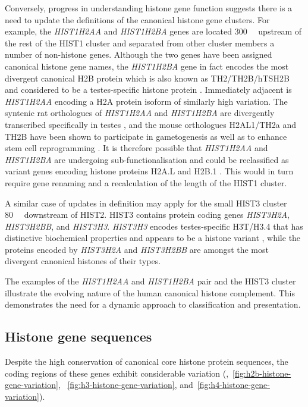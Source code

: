     Conversely, progress in understanding histone gene function
    suggests there is a need to update the definitions of the canonical histone gene clusters.
    For example, the \textit{HIST1H2AA} and \textit{HIST1H2BA} genes
    are located \SI{300}{\kilo\bp} upstream of the rest of the HIST1 cluster
    and separated from other cluster members a number of non-histone genes.
    Although the two genes have been assigned canonical histone gene names,
    the \textit{HIST1H2BA} gene in fact encodes the most divergent canonical H2B protein
    which is also known as TH2/TH2B/hTSH2B and considered to be
    a testes-specific histone protein \citep{Zalensky2002,LiAusio2005,Shinagawa2014}.
    Immediately adjacent is \textit{HIST1H2AA} encoding
    a H2A protein isoform of similarly high variation.
    The syntenic rat orthologues of \textit{HIST1H2AA} and \textit{HIST1H2BA}
    are divergently transcribed specifically in testes \citep{HuhChae1991},
    and the mouse orthologues H2AL1/TH2a and TH2B have been shown
    to participate in gametogenesis \citep{GovinCaron2007}
    as well as to enhance stem cell reprogramming \citep{ShinagawaIshii2014,PadavattanKumarevel2015}.
    It is therefore possible that \textit{HIST1H2AA} and \textit{HIST1H2BA}
    are undergoing sub-functionalisation and could be reclassified
    as variant genes encoding histone proteins H2A.L and H2B.1 \citep{Talbert2012}.
    This would in turn require gene renaming and a recalculation of the length of the HIST1 cluster.

    A similar case of updates in definition may apply
    for the small HIST3 cluster \SI{80}{\mega\bp} downstream of HIST2.
    HIST3 contains protein coding genes \textit{HIST3H2A}, \textit{HIST3H2BB}, and \textit{HIST3H3}.
    \textit{HIST3H3} encodes testes-specific H3T/H3.4
    that has distinctive biochemical properties
    and appears to be a histone variant \citep{WittExpCellRes1996,KurumizakaCOSB2013},
    while the proteins encoded by \textit{HIST3H2A} and \textit{HIST3H2BB}
    are amongst the most divergent canonical histones of their types.

    The examples of the \textit{HIST1H2AA} and \textit{HIST1H2BA} pair
    and the HIST3 cluster illustrate the evolving nature of the human canonical histone complement.
    This demonstrates the need for a dynamic approach to classification and presentation.

  \subsection{Histone gene sequences}
    Despite the high conservation of canonical core histone protein sequences,
    the coding regions of these genes exhibit considerable variation
    (,~\ref{fig:h2b-histone-gene-variation},
    ~\ref{fig:h3-histone-gene-variation}, and~\ref{fig:h4-histone-gene-variation}).

